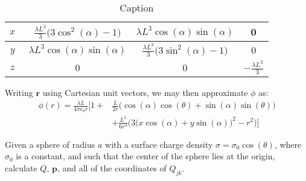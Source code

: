 \documentclass[crop=false,class=book,oneside]{standalone}
\begin{document}
\begin{solution}
\begin{table}[H]
\begin{tabular}{|c|c|c|c|}
                        \hline
                        $x\phantom{\bigg(}$&
                        $\frac{\lambda{L}^3}{3}\big(3\cos^{2}(\alpha)-1\big)$&
                        $\lambda{L}^{3}\cos(\alpha)\sin(\alpha)$&0\\
                        \hline
                        $y\phantom{\bigg(}$&
                        $\lambda{L}^{3}\cos(\alpha)\sin(\alpha)$&
                        $\frac{\lambda{L}^3}{3}\big(3\sin^{2}(\alpha)-1\big)$&0\\
                        \hline
                        $z\phantom{\bigg(}$&
                        0&0&$\minus\frac{\lambda{L}^{3}}{3}$\\
                        \hline
                    \end{tabular}
                    \caption{Caption}
                    \label{tab:my_label}
                \end{table}
                Writing $\mathbf{r}$ using Cartesian unit vectors,
                we may then approximate $\phi$ as:
                \begin{equation}
                    \begin{split}
                        \phi(r)=\frac{\lambda{L}}{4\pi\epsilon_{0}r}
                            \Big[1+&\frac{L}{2r}
                                \big(\cos(\alpha)\cos(\theta)+
                                     \sin(\alpha)\sin(\theta)\big)\\
                                &+\frac{L^{2}}{6r^{4}}
                                \Big(3\big(x\cos(\alpha)+
                                     y\sin(\alpha)\big)^{2}-r^{2}\Big)
                            \Big]
                    \end{split}
                \end{equation}
            \end{solution}
            \begin{problem}
                Given a sphere of radius $a$ with a surface
                charge density $\sigma=\sigma_{0}\cos(\theta)$, where
                $\sigma_{0}$ is a constant, and such that the center
                of the sphere lies at the origin, calculate $Q$,
                $\mathbf{p}$, and all of the coordinates of $Q_{jk}$.
            \end{problem}
\end{document}
